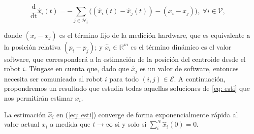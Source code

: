 \begin{equation} \label{eq: esti}
\frac{\mathrm{d}}{\mathrm{dt}} {\hat x_i}(t) = -\sum_{j\in\mathcal{N}_i} \Big((\hat x_i(t) - {\hat x}_j(t)) - (x_i - x_j) \Big), \; \forall i\in\mathcal{V},
\end{equation}


\newpage

donde $(x_i - x_j)$ es el término fijo de la medición hardware, que es equivalente a la posición relativa $(p_i - p_j)$; y $\hat x_i\in\mathbb{R}^m$ es el término dinámico es el valor software, que corresponderá a la estimación de la posición del centroide desde el robot $i$. Téngase en cuenta que, dado que $\hat x_j$ es un valor de software, entonces necesita ser comunicado al robot $i$ para todo $(i,j)\in\mathcal{E}$. A continuación, propondremos un resultado que estudia todas aquellas soluciones de \eqref{eq: esti} que nos permitirán estimar $x_i$.

\vspace{0.3cm}

\begin{prop}
La estimación $\hat x_i$ en (\ref{eq: esti}) converge de forma exponencialmente rápida al valor actual $x_i$ a medida que $t\to\infty$ si y solo si $\sum_i^N\hat x_i(0) = 0$.
\end{prop}

